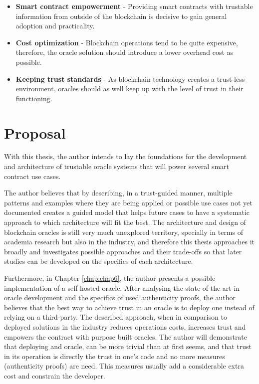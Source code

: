 
\begin{itemize}
    \item \textbf{Smart contract empowerment} - Providing smart contracts with trustable information from outside of the blockchain is decisive to gain general adoption and practicality.
    \item \textbf{Cost optimization} - Blockchain operations tend to be quite expensive, therefore, the oracle solution should introduce a lower overhead cost as possible.
    \item \textbf{Keeping trust standards} - As blockchain technology creates a trust-less environment, oracles should as well keep up with the level of trust in their functioning.
\end{itemize}

\section{Proposal}

With this thesis, the author intends to lay the foundations for the development and architecture of trustable oracle systems that will power several smart contract use cases.

The author believes that by describing, in a trust-guided manner, multiple patterns and examples where they are being applied or possible use cases not yet documented creates a guided model that helps future cases to have a systematic approach to which architecture will fit the best. The architecture and design of blockchain oracles is still very much unexplored territory, specially in terms of academia research but also in the industry, and therefore this thesis approaches it broadly and investigates possible approaches and their trade-offs so that later studies can be developed on the specifics of each architecture.

Furthermore, in Chapter \ref{chap:chap6}, the author presents a possible implementation of a self-hosted oracle. After analysing the state of the art in oracle development and the specifics of used authenticity proofs, the author believes that the best way to achieve trust in an oracle is to deploy one instead of relying on a third-party. The described approach, when in comparison to deployed solutions in the industry reduces operations costs, increases trust and empowers the contract with purpose built oracles. The author will demonstrate that deploying and oracle, can be more trivial than at first seems, and that trust in its operation is directly the trust in one's code and no more measures (authenticity proofs) are need. This measures usually add a considerable extra cost and constrain the developer.


